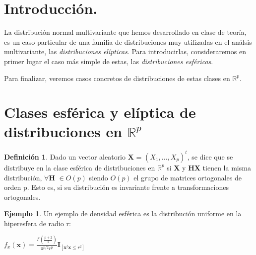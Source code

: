 \documentclass{article}
\theoremstyle{theorem-style}  %
\theoremstyle{definition}
\newtheorem{definition}{Definición}[section]
\theoremstyle{example-style}
\newtheorem{example}{Ejemplo}[section]
\begin{document}
 \maketitle



\newpage
\tableofcontents
\newpage
	

\section{Introducción.}

	La distribución normal multivariante que hemos desarrollado en clase de teoría, es un caso particular de una familia de distribuciones muy utilizadas en el análsis multivariante, las \textit{distribuciones elípticas}. Para introducirlas, consideraremos en primer lugar el caso más simple de estas, las \textit{distribuciones esféricas}.
	
	Para finalizar, veremos casos concretos de distribuciones de estas clases en $\mathbb{R}^p$.

\section{Clases esférica y elíptica de distribuciones en $\mathbb{R}^p$}
	
	\begin{definition}
		Dado un vector aleatorio \textbf{X} = $(X_1, ... , X_p)^t$, se dice que se distribuye en la clase esférica de distribuciones en $\mathbb{R}^p$ si \textbf{X} y \textbf{HX} tienen la misma distribución, $\forall$\textbf{H} $\in O(p)$ siendo $O(p)$ el grupo de matrices ortogonales de orden p. Esto es, si su distribución es invariante frente a transformaciones ortogonales. 
	\end{definition}

	

	\begin{example}
		Un ejemplo de densidad esférica es la distribución uniforme en la hiperesfera de radio r:
		
		\begin{center}
		\begin{math}
				f_x(\textbf{x}) = \frac{\Gamma(\frac{p+2}{2})}{\pi ^ {p/2} r^p} \textbf{I}_{[\textbf{x}^t\textbf{x} \leq r^2]}
		\end{math}
		\end{center}
	\end{example}
\end{document}
